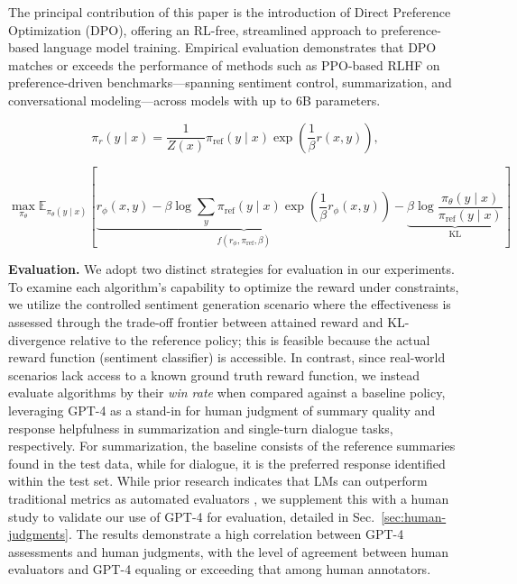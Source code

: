 The principal contribution of this paper is the introduction of Direct Preference Optimization (DPO), offering an RL-free, streamlined approach to preference-based language model training. Empirical evaluation demonstrates that DPO matches or exceeds the performance of methods such as PPO-based RLHF on preference-driven benchmarks—spanning sentiment control, summarization, and conversational modeling—across models with up to 6B parameters.

\begin{equation}\label{eq:op_policy}
    \pi_r(y\mid x) = \frac{1}{Z(x)}\pi_\text{ref}(y\mid x)\exp\left(\frac{1}{\beta}r(x, y)\right),
\end{equation}

\begin{equation}\label{eq:AC}
    \max_{\pi_{\theta}}\mathbb{E}_{\pi_{\theta}(y\mid x)}\left[\underbrace{r_{\phi}(x, y) -\beta\log\sum_{y}\pi_\text{ref}(y\mid x)\exp\left(\frac{1}{\beta}r_{\phi}(x, y)\right)}_{f(r_{\phi}, \pi_\text{ref}, \beta)} - \underbrace{\beta\log\frac{\pi_{\theta}(y\mid x)}{\pi_\text{ref}(y\mid x)}}_{\text{KL}}\right]
\end{equation}

\textbf{Evaluation.} We adopt two distinct strategies for evaluation in our experiments. To examine each algorithm's capability to optimize the reward under constraints, we utilize the controlled sentiment generation scenario where the effectiveness is assessed through the trade-off frontier between attained reward and KL-divergence relative to the reference policy; this is feasible because the actual reward function (sentiment classifier) is accessible. In contrast, since real-world scenarios lack access to a known ground truth reward function, we instead evaluate algorithms by their \textit{win rate} when compared against a baseline policy, leveraging GPT-4 as a stand-in for human judgment of summary quality and response helpfulness in summarization and single-turn dialogue tasks, respectively. For summarization, the baseline consists of the reference summaries found in the test data, while for dialogue, it is the preferred response identified within the test set. While prior research indicates that LMs can outperform traditional metrics as automated evaluators \citep{Chen2023ExploringTU}, we supplement this with a human study to validate our use of GPT-4 for evaluation, detailed in Sec.~\ref{sec:human-judgments}. The results demonstrate a high correlation between GPT-4 assessments and human judgments, with the level of agreement between human evaluators and GPT-4 equaling or exceeding that among human annotators.

